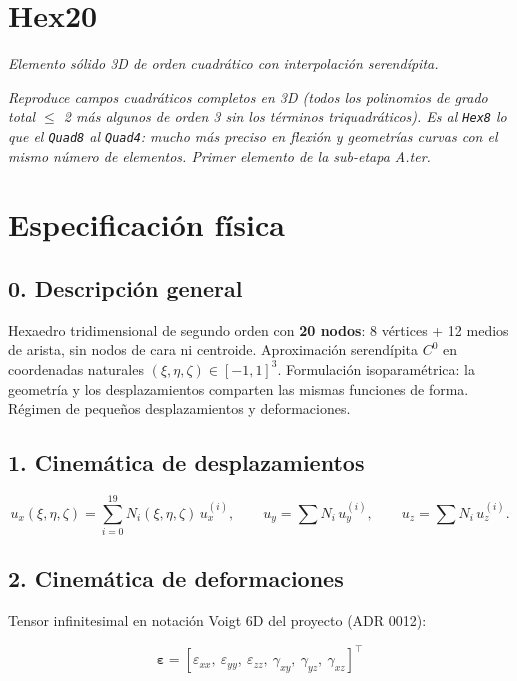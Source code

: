 \documentclass[11pt,letterpaper,oneside]{report}
\begin{document}
\newpage

\section{Hex20}



\textit{Elemento sólido 3D de orden cuadrático con interpolación serendípita.}

\textit{Reproduce campos cuadráticos completos en 3D (todos los polinomios de grado total \ensuremath{\le} 2 más algunos de orden 3 sin los términos triquadráticos). Es al \texttt{Hex8} lo que el \texttt{Quad8} al \texttt{Quad4}: mucho más preciso en flexión y geometrías curvas con el mismo número de elementos. Primer elemento de la sub-etapa A.ter.}



\section{Especificación física}

\subsection{0. Descripción general}

Hexaedro tridimensional de segundo orden con \textbf{20 nodos}: 8 vértices + 12 medios de arista, sin nodos de cara ni centroide. Aproximación serendípita $C^0$ en coordenadas naturales $(\xi, \eta, \zeta) \in [-1, 1]^3$. Formulación isoparamétrica: la geometría y los desplazamientos comparten las mismas funciones de forma. Régimen de pequeños desplazamientos y deformaciones.

\subsection{1. Cinemática de desplazamientos}

\[
u_x(\xi, \eta, \zeta) = \sum_{i=0}^{19} N_i(\xi, \eta, \zeta)\, u_x^{(i)}, \qquad u_y = \sum N_i\, u_y^{(i)}, \qquad u_z = \sum N_i\, u_z^{(i)}.
\]

\subsection{2. Cinemática de deformaciones}

Tensor infinitesimal en notación Voigt 6D del proyecto (ADR 0012):

\[
\boldsymbol\varepsilon = [\varepsilon_{xx},\ \varepsilon_{yy},\ \varepsilon_{zz},\ \gamma_{xy},\ \gamma_{yz},\ \gamma_{xz}]^\top
\]
\end{document}
